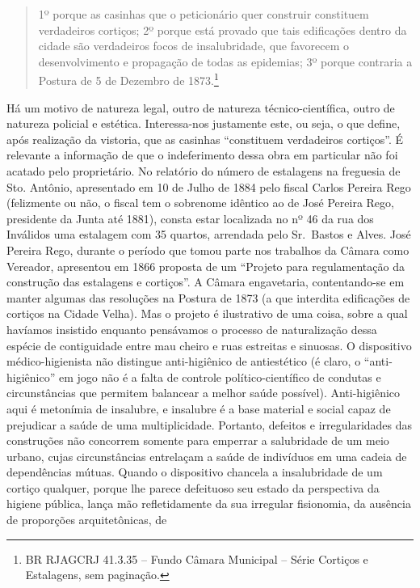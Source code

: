 \begin{quote}
1º porque as casinhas que o peticionário quer construir constituem
verdadeiros cortiços; 2º porque está provado que tais edificações dentro
da cidade são verdadeiros focos de insalubridade, que favorecem o
desenvolvimento e propagação de todas as epidemias; 3º porque contraria
a Postura de 5 de Dezembro de 1873.\footnote{BR RJAGCRJ 41.3.35 -- Fundo
  Câmara Municipal -- Série Cortiços e Estalagens, sem paginação.}
\end{quote}

Há um motivo de natureza legal, outro de natureza técnico-científica,
outro de natureza policial e estética. Interessa-nos justamente este, ou
seja, o que define, após realização da vistoria, que as casinhas
``constituem verdadeiros cortiços''. É relevante a informação de que o
indeferimento dessa obra em particular não foi acatado pelo
proprietário. No relatório do número de estalagens na freguesia de Sto.
Antônio, apresentado em 10 de Julho de 1884 pelo fiscal Carlos Pereira
Rego (felizmente ou não, o fiscal tem o sobrenome idêntico ao de José
Pereira Rego, presidente da Junta até 1881), consta estar localizada no
nº 46 da rua dos Inválidos uma estalagem com 35 quartos, arrendada pelo
Sr.~Bastos e Alves. José Pereira Rego, durante o período que tomou parte
nos trabalhos da Câmara como Vereador, apresentou em 1866 proposta de um
``Projeto para regulamentação da construção das estalagens e cortiços''.
A Câmara engavetaria, contentando-se em manter algumas das resoluções na
Postura de 1873 (a que interdita edificações de cortiços na Cidade
Velha). Mas o projeto é ilustrativo de uma coisa, sobre a qual havíamos
insistido enquanto pensávamos o processo de naturalização dessa espécie
de contiguidade entre mau cheiro e ruas estreitas e sinuosas. O
dispositivo médico-higienista não distingue anti-higiênico de
antiestético (é claro, o ``anti-higiênico'' em jogo não é a falta de
controle político-científico de condutas e circunstâncias que permitem
balancear a melhor saúde possível). Anti-higiênico aqui é metonímia de
insalubre, e insalubre é a base material e social capaz de prejudicar a
saúde de uma multiplicidade. Portanto, defeitos e irregularidades das
construções não concorrem somente para emperrar a salubridade de um meio
urbano, cujas circunstâncias entrelaçam a saúde de indivíduos em uma
cadeia de dependências mútuas. Quando o dispositivo chancela a
insalubridade de um cortiço qualquer, porque lhe parece defeituoso seu
estado da perspectiva da higiene pública, lança mão refletidamente da
sua irregular fisionomia, da ausência de proporções arquitetônicas, de
